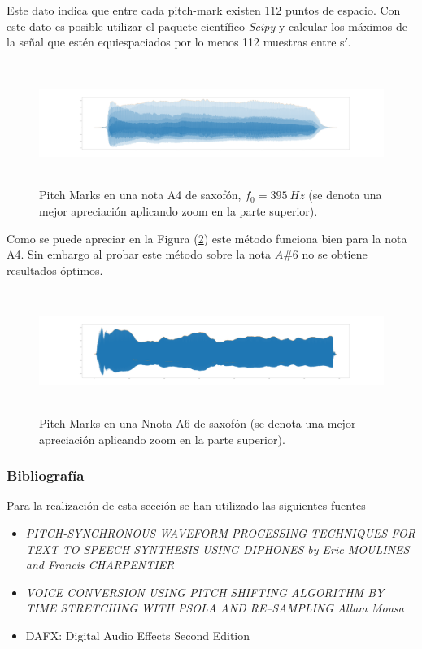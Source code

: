 Este dato indica que entre cada pitch-mark existen 112 puntos de espacio. Con este dato es posible utilizar el paquete científico \textit{Scipy} y calcular los máximos de la señal que estén equiespaciados por lo menos 112 muestras entre sí.
\begin{figure}[H]
	\centering
	\includegraphics[width=\linewidth,height=150px]{ImagenesEjercicio5/noteA4}
	\caption{Pitch Marks en una nota A4 de saxofón, $f_0 = 395 \ Hz$ (se denota una mejor apreciación aplicando zoom en la parte superior).}
	\label{fig:pmsnotea4}
\end{figure}

Como se puede apreciar en la Figura (\ref{fig:pmsnotea4}) este método funciona bien para la nota A4. Sin embargo al probar este método sobre la nota $A\#6$ no se obtiene resultados óptimos.
\begin{figure}[H]
	\centering
	\includegraphics[width=\linewidth,height=150px]{ImagenesEjercicio5/Asharp6.png}
	\caption{Pitch Marks en una Nnota A6 de saxofón (se denota una mejor apreciación aplicando zoom en la parte superior).}
	\label{fig:pmsnotea4}
\end{figure}
\subsubsection{Bibliografía}
Para la realización de esta sección se han utilizado las siguientes fuentes

\begin{itemize}
	\item \textit{PITCH-SYNCHRONOUS WAVEFORM PROCESSING TECHNIQUES FOR
		TEXT-TO-SPEECH SYNTHESIS USING DIPHONES by
		Eric MOULINES and Francis CHARPENTIER }
	\item \textit{VOICE CONVERSION USING PITCH SHIFTING ALGORITHM
		BY TIME STRETCHING WITH PSOLA AND RE–SAMPLING
		Allam Mousa }
	\item{DAFX: Digital Audio Effects
		Second Edition}
\end{itemize}